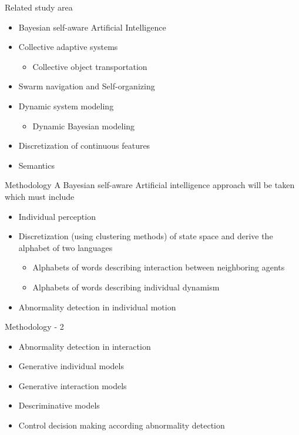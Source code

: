 \documentclass[unknownkeysallowed]{beamer}
\begin{document}
	\begin{frame}{Related study area}
		\begin{itemize}
			\item Bayesian self-aware Artificial Intelligence 
			\item Collective adaptive systems
				\begin{itemize}
					\item Collective object transportation
				\end{itemize}
			\item Swarm navigation and Self-organizing
			\item Dynamic system modeling
				\begin{itemize}
					\item Dynamic Bayesian modeling
				\end{itemize}
			\item Discretization of continuous features
			\item Semantics
		\end{itemize}
	\end{frame}

	\begin{frame}{Methodology}
		A Bayesian self-aware Artificial intelligence approach will be taken which must include
		\begin{itemize}
			\item Individual perception
			\item Discretization (using clustering methods) of state space and derive the alphabet of two languages
				\begin{itemize}
					\item Alphabets of words describing interaction between neighboring agents
					\item Alphabets of words describing individual dynamism 
				\end{itemize}
			\item Abnormality detection in individual motion
		\end{itemize}
	\end{frame}

	\begin{frame}{Methodology - 2}
		\begin{itemize}
			\item Abnormality detection in interaction
			\item Generative individual models
			\item Generative interaction models
			\item Descriminative models
			\item Control decision making according abnormality detection
		\end{itemize}
	\end{frame}
\end{document}
